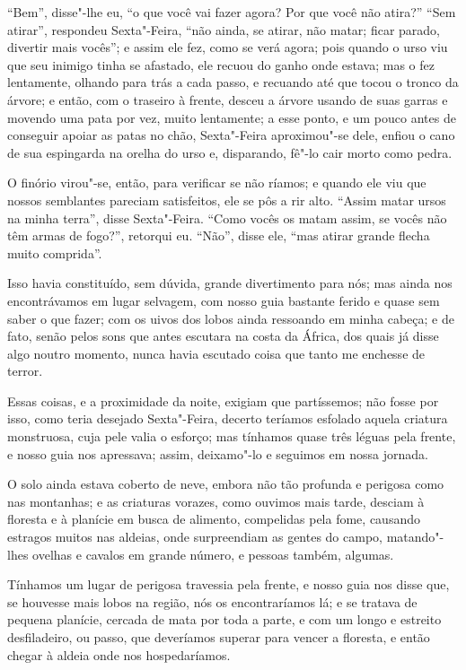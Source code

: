 ``Bem'', disse"-lhe eu, ``o que você vai fazer agora? Por que você não
atira?'' ``Sem atirar'', respondeu Sexta"-Feira, ``não ainda, se atirar,
não matar; ficar parado, divertir mais vocês''; e assim ele fez, como se
verá agora; pois quando o urso viu que seu inimigo tinha se afastado,
ele recuou do ganho onde estava; mas o fez lentamente, olhando para trás
a cada passo, e recuando até que tocou o tronco da árvore; e então, com
o traseiro à frente, desceu a árvore usando de suas garras e movendo uma
pata por vez, muito lentamente; a esse ponto, e um pouco antes de
conseguir apoiar as patas no chão, Sexta"-Feira aproximou"-se dele, enfiou
o cano de sua espingarda na orelha do urso e, disparando, fê"-lo cair
morto como pedra.

O finório virou"-se, então, para verificar se não ríamos; e quando ele
viu que nossos semblantes pareciam satisfeitos, ele se pôs a rir alto.
``Assim matar ursos na minha terra'', disse Sexta"-Feira. ``Como vocês os
matam assim, se vocês não têm armas de fogo?'', retorqui eu. ``Não'',
disse ele, ``mas atirar grande flecha muito comprida''.

Isso havia constituído, sem dúvida, grande divertimento para nós; mas
ainda nos encontrávamos em lugar selvagem, com nosso guia bastante
ferido e quase sem saber o que fazer; com os uivos dos lobos ainda
ressoando em minha cabeça; e de fato, senão pelos sons que antes
escutara na costa da África, dos quais já disse algo noutro momento,
nunca havia escutado coisa que tanto me enchesse de terror.

Essas coisas, e a proximidade da noite, exigiam que partíssemos; não
fosse por isso, como teria desejado Sexta"-Feira, decerto teríamos
esfolado aquela criatura monstruosa, cuja pele valia o esforço; mas
tínhamos quase três léguas pela frente, e nosso guia nos apressava;
assim, deixamo"-lo e seguimos em nossa jornada.

O solo ainda estava coberto de neve, embora não tão profunda e perigosa
como nas montanhas; e as criaturas vorazes, como ouvimos mais tarde,
desciam à floresta e à planície em busca de alimento, compelidas pela
fome, causando estragos muitos nas aldeias, onde surpreendiam as gentes
do campo, matando"-lhes ovelhas e cavalos em grande número, e pessoas
também, algumas.

Tínhamos um lugar de perigosa travessia pela frente, e nosso guia nos
disse que, se houvesse mais lobos na região, nós os encontraríamos lá; e
se tratava de pequena planície, cercada de mata por toda a parte, e com
um longo e estreito desfiladeiro, ou passo, que deveríamos superar para
vencer a floresta, e então chegar à aldeia onde nos hospedaríamos.

